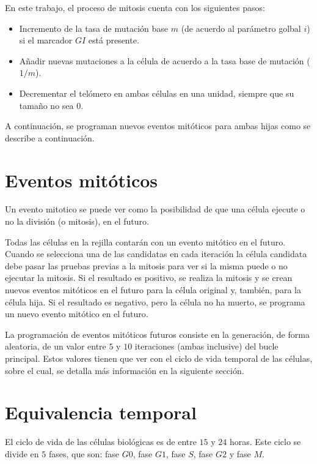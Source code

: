 En este trabajo, el proceso de mitosis cuenta con los siguientes pasos:

\begin{itemize}
    \item Incremento de la tasa de mutación base $m$ (de acuerdo al parámetro golbal $i$) si el marcador
    $GI$ está presente.
    \item Añadir nuevas mutaciones a la célula de acuerdo a la tasa base de mutación ($1/m$).
    \item Decrementar el telómero en ambas células en una unidad, siempre que su tamaño no sea 0.
\end{itemize}

A continuación, se programan nuevos eventos mitóticos para ambas hijas como se describe a continuación.

\section{Eventos mitóticos}

Un evento mitotico se puede ver como la posibilidad de que una célula ejecute o no la división (o mitosis),
en el futuro.

Todas las células en la rejilla contarán con un evento mitótico en el futuro. Cuando se selecciona una
de las candidatas en cada iteración la célula candidata debe pasar las pruebas previas a la mitosis para ver
si la misma puede o no ejecutar la mitosis. Si el resultado es positivo, se realiza la mitosis y se crean
nuevos eventos mitóticos en el futuro para la célula original y, también, para la célula hija.
Si el resultado es negativo, pero la célula no ha muerto, se programa un nuevo evento mitótico en el futuro.

La programación de eventos mitóticos futuros consiste en la generación, de forma aleatoria, de un valor
entre $5$ y $10$ iteraciones (ambas inclusive) del bucle principal. Estos valores tienen que ver con el ciclo de vida
temporal de las células, sobre el cual, se detalla más información en la siguiente sección.

\section{Equivalencia temporal}

El ciclo de vida de las células biológicas es de entre $15$ y $24$ horas. Este ciclo se divide en $5$ fases, que son:
fase $G0$, fase $G1$, fase $S$, fase $G2$ y fase $M$.

